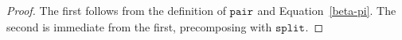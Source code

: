 \documentclass[10pt]{article}
\theoremstyle{definition}
\newcommand\ApEl[2]{\mathcal{T}_{#1}\langle#2\rangle}
\newcommand\bdot[0]{\mathbin{.}}
\newcommand\ap[2]{\ensuremath{#1 \langle #2 \rangle }}
\newcommand\ApPlus[2]{\ensuremath{{#1}^+ \langle #2 \rangle }}
\newcommand\One{\ensuremath{\mathds{1}}}
\newcommand\var[1]{\ensuremath{\mathtt{var}_{#1}}}
\newcommand\ApOne[1]{\ensuremath{\One_{\langle {#1} \rangle }}}
\newcommand\contract[1]{\ensuremath{\mathtt{contract}_{#1}}}
\newcommand\fibpair[1]{\ensuremath{\mathtt{fibpair}_{#1}}}
\newcommand\pair[1]{\ensuremath{\mathtt{pair}_{#1}}}
\newcommand\tsplit[1]{\ensuremath{\mathtt{split}_{#1}}}
\begin{document}
\begin{proof}
The first follows from the definition of $\pair{}$ and Equation~\ref{beta-pi}. The second is immediate from the first, precomposing with $\tsplit{}$. 


\end{proof}
\end{document}
